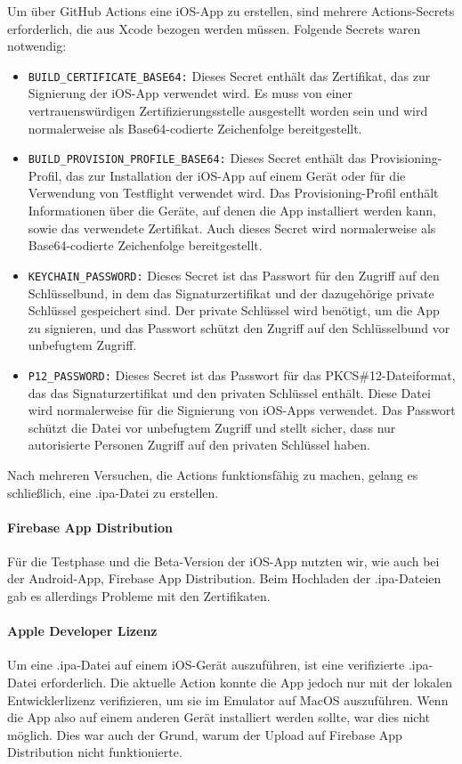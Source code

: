 Um über GitHub Actions eine iOS-App zu erstellen, sind
mehrere Actions-Secrets erforderlich, die aus Xcode bezogen
werden müssen. Folgende Secrets waren notwendig:

\begin{itemize}
  \item \verb|BUILD_CERTIFICATE_BASE64:| Dieses Secret enthält das Zertifikat, das zur Signierung der iOS-App verwendet wird. Es muss von einer vertrauenswürdigen Zertifizierungsstelle ausgestellt worden sein und wird normalerweise als Base64-codierte Zeichenfolge bereitgestellt.
  \item \verb|BUILD_PROVISION_PROFILE_BASE64:| Dieses Secret enthält das Provisioning-Profil, das zur Installation der iOS-App auf einem Gerät oder für die Verwendung von Testflight verwendet wird. Das Provisioning-Profil enthält Informationen über die Geräte, auf denen die App installiert werden kann, sowie das verwendete Zertifikat. Auch dieses Secret wird normalerweise als Base64-codierte Zeichenfolge bereitgestellt.
  \item \verb|KEYCHAIN_PASSWORD:| Dieses Secret ist das Passwort für den Zugriff auf den Schlüsselbund, in dem das Signaturzertifikat und der dazugehörige private Schlüssel gespeichert sind. Der private Schlüssel wird benötigt, um die App zu signieren, und das Passwort schützt den Zugriff auf den Schlüsselbund vor unbefugtem Zugriff.
  \item \verb|P12_PASSWORD:| Dieses Secret ist das Passwort für das PKCS\#12-Dateiformat, das das Signaturzertifikat und den privaten Schlüssel enthält. Diese Datei wird normalerweise für die Signierung von iOS-Apps verwendet. Das Passwort schützt die Datei vor unbefugtem Zugriff und stellt sicher, dass nur autorisierte Personen Zugriff auf den privaten Schlüssel haben.
\end{itemize}

Nach mehreren Versuchen, die Actions funktionsfähig zu
machen, gelang es schließlich, eine .ipa-Datei zu erstellen.

\paragraph{Firebase App Distribution}
Für die Testphase und die Beta-Version der iOS-App nutzten
wir, wie auch bei der Android-App, Firebase App
Distribution. Beim Hochladen der .ipa-Dateien gab es
allerdings Probleme mit den Zertifikaten.

\paragraph{Apple Developer Lizenz}
Um eine .ipa-Datei auf einem iOS-Gerät auszuführen, ist eine verifizierte .ipa-Datei erforderlich. Die aktuelle Action konnte die App jedoch nur mit der lokalen Entwicklerlizenz verifizieren, um sie im Emulator auf MacOS auszuführen. Wenn die App also auf einem anderen Gerät installiert werden sollte, war dies nicht möglich. Dies war auch der Grund, warum der Upload auf Firebase App Distribution nicht funktionierte.

